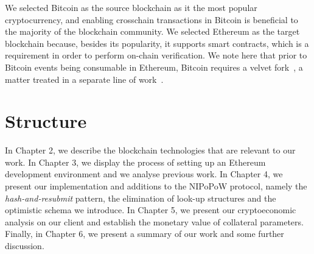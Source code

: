 We selected Bitcoin as the source blockchain as it the most popular cryptocurrency,
and enabling crosschain transactions in Bitcoin is beneficial to the
majority of the blockchain community. We selected Ethereum as the target blockchain
because, besides its popularity, it supports smart contracts, which is a
requirement in order to perform on-chain verification. We note here that
prior to Bitcoin events being consumable in Ethereum, Bitcoin requires a
velvet fork~\cite{velvet-fork}, a matter treated in a separate line of
work~\cite{velvet-nipopows}.

\section{Structure}

In Chapter 2, we describe the blockchain technologies that are relevant to our
work. In Chapter 3, we display the process of setting up an Ethereum
development environment and we analyse previous work. In Chapter 4, we present
our implementation and additions to the NIPoPoW protocol, namely the
\emph{hash-and-resubmit} pattern, the elimination of look-up structures and the
optimistic schema we introduce. In Chapter 5, we present our cryptoeconomic
analysis on our client and establish the monetary value of collateral
parameters. Finally, in Chapter 6, we present a summary of our work and some
further discussion.
